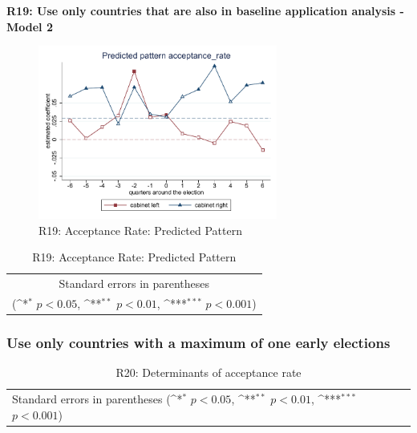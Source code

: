 \documentclass[10pt,a4paper]{scrartcl}
\begin{document}
\clearpage
\textbf{R19: Use only countries that are also in baseline application analysis - Model 2}
\begin{figure}[!ht]
	\centering
	\includegraphics[width=0.7\textwidth]{figures_edited/acceptance_rate_graph2_R19.pdf}
	\caption{R19: Acceptance Rate: Predicted Pattern}
\end{figure}

\begin{table}[!ht]\centering
	\footnotesize
	\renewcommand{\arraystretch}{1.2}
	\def\sym#1{\ifmmode^{#1}\else\(^{#1}\)\fi}
	\caption{R19: Acceptance Rate: Predicted Pattern}
	\begin{tabular}{l*{2}{c}}
		\hline\hline
		
		\hline\hline
		\multicolumn{3}{c}{\footnotesize Standard errors in parentheses} \\
		\multicolumn{3}{c}{\footnotesize (\sym{*} \(p<0.05\), \sym{**} \(p<0.01\), \sym{***} \(p<0.001\))} \\
	\end{tabular}
\end{table}




\clearpage
\FloatBarrier
\subsubsection{Use only countries with a maximum of one early elections}
\begin{table}[!ht]\centering
	\renewcommand{\arraystretch}{1.25}
	\small
	\def\sym#1{\ifmmode^{#1}\else\(^{#1}\)\fi}
	\caption{R20: Determinants of acceptance rate}
	\begin{tabular}{l*{3}{c}}
		\hline\hline
		
		\hline\hline
		\multicolumn{4}{l}{\footnotesize Standard errors in parentheses (\sym{*} \(p<0.05\), \sym{**} \(p<0.01\), \sym{***} \(p<0.001\))}\\
	\end{tabular}
\end{table}
\end{document}
